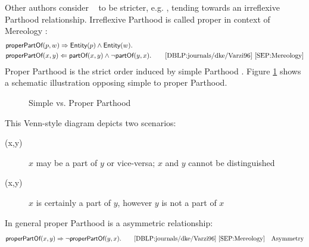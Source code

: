 Other authors consider \partOf~ to be stricter, e.g. \cite{DBLP:conf/sle/Lammel16}, tending towards an irreflexive \gls{Parthood} relationship.
Irreflexive \gls{Parthood} is called proper in context of \gls{Mereology} \cite{DBLP:journals/dke/Varzi96} \cite{SEP:Mereology}:
\begin{align*}
&\textsf{properPartOf}(p,w)
\Rightarrow
\textsf{Entity}(p) \wedge \textsf{Entity}(w).\\
&\textsf{properPartOf}(x,y)
\Leftarrow
\textsf{partOf}(x,y) \wedge \neg \textsf{partOf}(y,x).
\qquad\text{\cite{DBLP:journals/dke/Varzi96} \cite{SEP:Mereology}}
\end{align*}
Proper \gls{Parthood} is the strict order induced by simple \gls{Parthood} \cite{DBLP:journals/dke/Varzi96} \cite{SEP:Mereology}.
Figure \ref{figure:SchematicProperPart} shows a schematic illustration opposing simple to proper \gls{Parthood}.
\begin{figure}[h!]
\begin{center}
\end{center}
\caption{Simple vs. Proper Parthood}
\label{figure:SchematicProperPart}
\end{figure}
This Venn-style diagram depicts two scenarios:
\begin{description}
\item[\partOf(x,y)]
$x$ may be a part of $y$ or vice-versa;
$x$ and $y$ cannot be distinguished
\item[\properPartOf(x,y)] 
$x$ is certainly a part of $y$, however $y$ is not a part of $x$
\end{description} 
In general proper \gls{Parthood} is a asymmetric relationship:
\begin{align*}
&\textsf{properPartOf}(x,y) 
\Rightarrow
\neg \textsf{properPartOf}(y,x).
\qquad\text{\cite{DBLP:journals/dke/Varzi96} \cite{SEP:Mereology}}
&\text{Asymmetry}
\end{align*}

